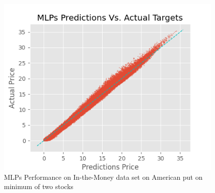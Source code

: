 \begin{figure}[th]
\centering
\includegraphics{Figures/inMoneyAmerMinP.png}
\decoRule
\caption[MLPs Performance on In-the-Money data set on American bivariate contingent claim]{MLPs Performance on In-the-Money data set on American put on minimum of two stocks}
\label{fig:MLPsEuroC}
\end{figure}



